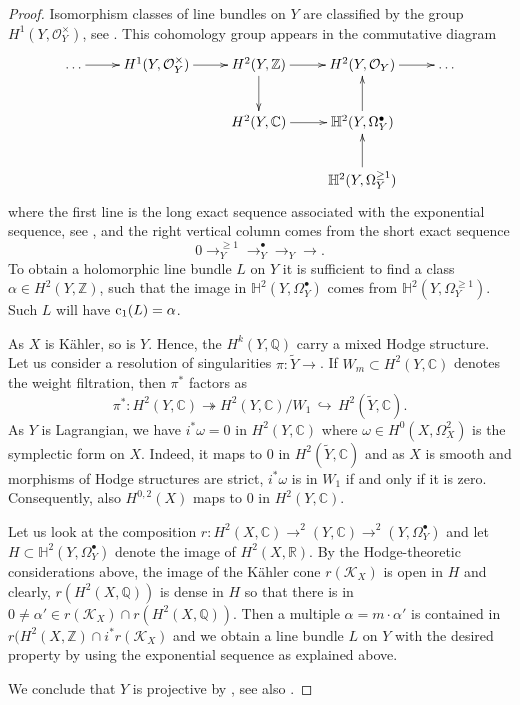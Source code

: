 \documentclass[a4paper,11pt,final]{amsart}
\theoremstyle{plain}
\theoremstyle{definition}
\numberwithin{equation}{section}
\theoremstyle{remark}
\begin{document}
\begin{proof} Isomorphism classes of line bundles on $Y$ are classified by the group $H^1(Y,{{\mathcal O}}^\times_Y)$, see \cite[Kap V, {{$\mathsection\,$}} 3.2]{GR}. This cohomology group appears in the commutative diagram
\[
\begin{xy}
\xymatrix{
\ldots \ar[r] & H^1(Y,{{\mathcal O}}_Y^\times) \ar[r] & H^2(Y, {{\mathbb Z}}) \ar[r] \ar[d] & H^2(Y,{{\mathcal O}}_Y) \ar[r] & \ldots\\
& & H^2(Y,{{\mathbb C}}) \ar[r] & {{\mathbb H}}^2(Y,\Omega_Y^\bullet) \ar[u] & \\
& & & {{\mathbb H}}^2(Y,\Omega_Y^{\geq 1}) \ar[u] & \\
}
\end{xy}
\]
where the first line is the long exact sequence associated with the exponential sequence, see \cite[Kap V, {{$\mathsection\,$}} 2.4]{GR}, and the right vertical column comes from the short exact sequence 
\[
0{\xrightarrow{\ \ }}_Y^{\geq 1} {\xrightarrow{\ \ }}_Y^\bullet {\xrightarrow{\ \ }}_Y {\xrightarrow{\ \ }}.
\]
To obtain a holomorphic line bundle $L$ on $Y$ it is sufficient to find a class $\alpha \in H^2(Y,{{\mathbb Z}})$, such that the image in ${{\mathbb H}}^2(Y,\Omega_Y^\bullet)$ comes from ${{\mathbb H}}^2(Y,\Omega_Y^{\geq 1})$. Such $L$ will have ${{\rm c}}_1(L)=\alpha$.

As $X$ is K\"ahler, so is $Y$. Hence, the $H^k(Y,{{\mathbb Q}})$ carry a mixed Hodge structure. Let us consider a resolution of singularities $\pi:{{\widetilde{Y}}} {\xrightarrow{\ \ }}$. If $W_m \subset H^2(Y,{{\mathbb C}})$ denotes the weight filtration, then $\pi^*$ factors as 
$$\pi^*:H^2(Y,{{\mathbb C}}) {{{\twoheadrightarrow}}} H^2(Y,{{\mathbb C}})/W_1 {{\, \hookrightarrow\,}} H^2({{\widetilde{Y}}},{{\mathbb C}}).$$ 
As $Y$ is Lagrangian, we have $i^*\omega = 0$ in $H^2(Y,{{\mathbb C}})$ where $\omega \in H^0(X,\Omega_X^2)$ is the symplectic form on $X$. Indeed, it maps to $0$ in $H^2({{\widetilde{Y}}},{{\mathbb C}})$ and as $X$ is smooth and morphisms of Hodge structures are strict, $i^*\omega$ is in $W_1$ if and only if it is zero. Consequently, also $H^{0,2}(X)$ maps to $0$ in $H^2(Y,{{\mathbb C}})$.

Let us look at the composition $r:H^2(X,{{\mathbb C}}){\xrightarrow{\ \ }}^2(Y,{{\mathbb C}}){\xrightarrow{\ \ }}^2(Y,\Omega_Y^\bullet)$ and let $H \subset {{\mathbb H}}^2(Y,\Omega_Y^\bullet)$ denote the image of $H^2(X,{{\mathbb R}})$. 
By the Hodge-theoretic considerations above, the image of the K\"ahler cone $r({{\mathcal K}}_X)$ is open in $H$ and clearly, $r(H^2(X,{{\mathbb Q}}))$ is dense in $H$
so that there is in $0\neq \alpha'\in r({{\mathcal K}}_X) \cap r(H^2(X,{{\mathbb Q}}))$. Then a multiple $\alpha= m \cdot \alpha'$ is contained in $r(H^2(X,{{\mathbb Z}}) \cap i^*r({{\mathcal K}}_X)$ and we obtain a line bundle $L$ on $Y$ with the desired property by using the exponential sequence as explained above.

We conclude that $Y$ is projective by \cite[Chapter V, Corollary 4.5]{SCVVII}, see also \cite[3, Satz 1 and Satz~2]{Gra62}.
\end{proof} 
\end{document}
